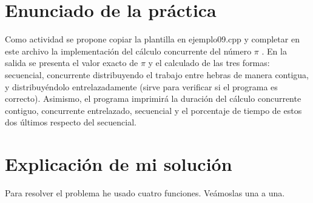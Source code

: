 \documentclass[12pt]{article}
\begin{document}
\section{Enunciado de la práctica}
Como actividad se propone copiar la plantilla en ejemplo09.cpp y completar en este archivo la implementación del cálculo concurrente del número $\pi$ . En la salida se presenta el valor exacto de $\pi$ y el calculado de las tres formas: secuencial, concurrente distribuyendo el trabajo entre hebras de manera contigua, y distribuyéndolo entrelazadamente (sirve para verificar si el programa es correcto). Asimismo, el programa imprimirá la duración del cálculo concurrente contiguo, concurrente entrelazado, secuencial y el porcentaje de tiempo
de estos dos últimos respecto del secuencial.

\section{Explicación de mi solución}
Para resolver el problema he usado cuatro funciones. Veámoslas una a una.
\end{document}
